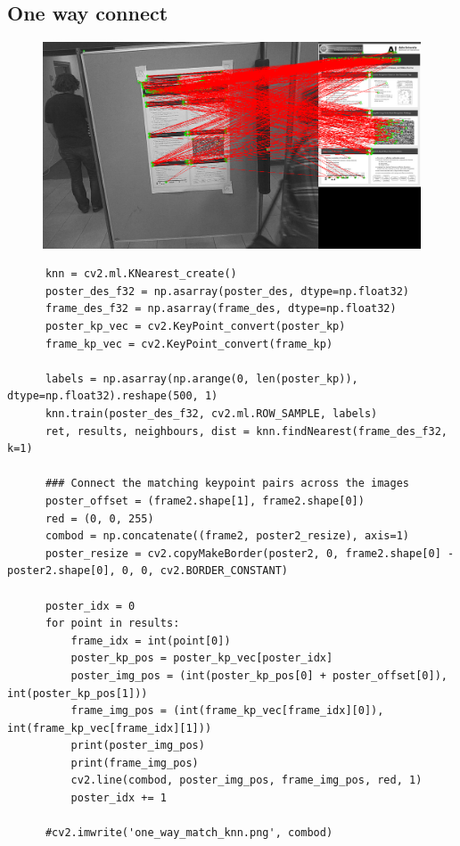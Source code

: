 \documentclass{article}
\begin{document}
\subsection{One way connect}
  \begin{figure}[h]
      \centering
      \includegraphics[scale=0.35]{one_way_match_knn}
  \end{figure}

  \begin{verbatim}
      knn = cv2.ml.KNearest_create()
      poster_des_f32 = np.asarray(poster_des, dtype=np.float32)
      frame_des_f32 = np.asarray(frame_des, dtype=np.float32)
      poster_kp_vec = cv2.KeyPoint_convert(poster_kp)
      frame_kp_vec = cv2.KeyPoint_convert(frame_kp)

      labels = np.asarray(np.arange(0, len(poster_kp)), dtype=np.float32).reshape(500, 1)
      knn.train(poster_des_f32, cv2.ml.ROW_SAMPLE, labels)
      ret, results, neighbours, dist = knn.findNearest(frame_des_f32, k=1)

      ### Connect the matching keypoint pairs across the images
      poster_offset = (frame2.shape[1], frame2.shape[0])
      red = (0, 0, 255)
      combod = np.concatenate((frame2, poster2_resize), axis=1)
      poster_resize = cv2.copyMakeBorder(poster2, 0, frame2.shape[0] - poster2.shape[0], 0, 0, cv2.BORDER_CONSTANT)

      poster_idx = 0
      for point in results:
          frame_idx = int(point[0])
          poster_kp_pos = poster_kp_vec[poster_idx]
          poster_img_pos = (int(poster_kp_pos[0] + poster_offset[0]), int(poster_kp_pos[1]))
          frame_img_pos = (int(frame_kp_vec[frame_idx][0]), int(frame_kp_vec[frame_idx][1]))
          print(poster_img_pos)
          print(frame_img_pos)
          cv2.line(combod, poster_img_pos, frame_img_pos, red, 1)
          poster_idx += 1

      #cv2.imwrite('one_way_match_knn.png', combod)
\end{verbatim}
\end{document}
